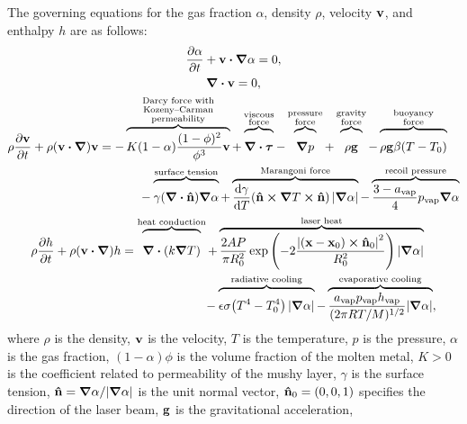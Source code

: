 \documentclass{article}
\newcommand{\evapor}[1]{{#1}_\mathrm{vap}}
\newcommand{\bv}{\vb{v}}
\newcommand{\bn}{\vu{n}}
\newcommand{\bx}{\vb{x}}
\newcommand{\btau}{\vb*\tau}
\begin{document}
The governing equations for the gas fraction $\alpha$, density $\rho$, velocity $\bv$, and enthalpy $h$ are as follows:
\begin{gather}
    \pdv{\alpha}{t} + \bv\vdot\grad\alpha = 0, \label{eq:alpha}\\
    \div\bv = 0, \label{eq:continuity}\\
    \begin{multlined}
    \rho\pdv{\bv}{t} + \rho(\bv\vdot\grad)\bv =
        - \myoverbrace{K(1-\alpha)\frac{(1-\phi)^2}{\phi^3}\bv}
            {Darcy force with\\Kozeny--Carman\\permeability}
        + \myoverbrace{\div\btau}{viscous\\force}
        - \myoverbrace{\grad{p}}{pressure\\force}
        + \myoverbrace{\rho\vb{g}}{gravity\\force}
        - \myoverbrace{\rho\vb{g}\beta(T-T_0)}{buoyancy\\force}\\
        - \myoverbrace{\gamma\qty(\div\bn)\grad\alpha}{surface tension}
        + \myoverbrace{\dv{\gamma}{T}\qty(\bn\cp\grad{T}\cp\bn)|\grad\alpha|}{Marangoni force}
        -\myoverbrace{\frac{3-\evapor{a}}4\evapor{p}\grad\alpha}{recoil pressure}
    \end{multlined}\label{eq:v}\\
    \begin{multlined}
    \rho\pdv{h}{t} + \rho(\bv\vdot\grad)h
        = \myoverbrace[\qty(\frac12)^2]{\div(k\grad{T})}{heat conduction}
        + \myoverbrace{\frac{2AP}{\pi R_0^2}
            \exp\qty(-2\frac{\qty|(\bx-\bx_0)\cp\bn_0|^2}{R_0^2})|\grad\alpha|}{laser heat}\\
        - \myoverbrace{\epsilon\sigma\qty(T^4-T_0^4)|\grad\alpha|}{radiative cooling}
        - \myoverbrace{\frac{\evapor{a}\evapor{p}\evapor{h}}
            {(2\pi RT/M)^{1/2}}|\grad\alpha|}{evaporative cooling},
    \end{multlined}\label{eq:h}
\end{gather}
where $\rho$ is the density, $\bv$ is the velocity, $T$ is the temperature,
$p$ is the pressure, $\alpha$ is the gas fraction,
$(1-\alpha)\phi$ is the volume fraction of the molten metal,
$K>0$ is the coefficient related to permeability of the mushy layer,
$\gamma$ is the surface tension,
$\bn = \grad\alpha/|\grad\alpha|$ is the unit normal vector,
$\bn_0 = (0,0,1)$ specifies the direction of the laser beam,
$\vb{g}$ is the gravitational acceleration,
\end{document}
